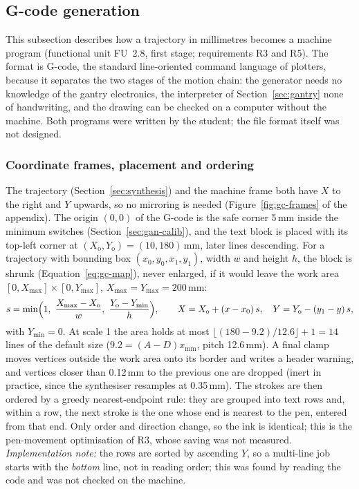 \subsection{G-code generation}
\label{sec:gcode}

This subsection describes how a trajectory in millimetres becomes a machine program (functional unit FU~2.8, first stage; requirements R3 and R5).
The format is G-code, the standard line-oriented command language of plotters, because it separates the two stages of the motion chain: the generator needs no knowledge of the gantry electronics, the interpreter of Section~\ref{sec:gantry} none of handwriting, and the drawing can be checked on a computer without the machine.
Both programs were written by the student; the file format itself was not designed.

\subsubsection{Coordinate frames, placement and ordering}

The trajectory (Section~\ref{sec:synthesis}) and the machine frame both have $X$ to the right and $Y$ upwards, so no mirroring is needed (Figure~\ref{fig:gc-frames} of the appendix).
The origin $(0,0)$ of the G-code is the safe corner 5\,mm inside the minimum switches (Section~\ref{sec:gan-calib}), and the text block is placed with its top-left corner at $(X_{\mathrm o},Y_{\mathrm o})=(10,180)$\,mm, later lines descending.
For a trajectory with bounding box $(x_0,y_0,x_1,y_1)$, width $w$ and height $h$, the block is shrunk (Equation~\ref{eq:gc-map}), never enlarged, if it would leave the work area $[0,X_{\max}]\times[0,Y_{\max}]$, $X_{\max}=Y_{\max}=200$\,mm:
\begin{equation}
s=\min\Bigl(1,\ \frac{X_{\max}-X_{\mathrm o}}{w},\ \frac{Y_{\mathrm o}-Y_{\min}}{h}\Bigr),\qquad X=X_{\mathrm o}+(x-x_0)\,s,\quad Y=Y_{\mathrm o}-(y_1-y)\,s,
\label{eq:gc-map}
\end{equation}
with $Y_{\min}=0$.
At scale 1 the area holds at most $\lfloor(180-9.2)/12.6\rfloor+1=14$ lines of the default size ($9.2=(A-D)x_{\mathrm{mm}}$, pitch 12.6\,mm).
A final clamp moves vertices outside the work area onto its border and writes a header warning, and vertices closer than 0.12\,mm to the previous one are dropped (inert in practice, since the synthesiser resamples at 0.35\,mm).
The strokes are then ordered by a greedy nearest-endpoint rule: they are grouped into text rows and, within a row, the next stroke is the one whose end is nearest to the pen, entered from that end.
Only order and direction change, so the ink is identical; this is the pen-movement optimisation of R3, whose saving was not measured.
\emph{Implementation note:} the rows are sorted by ascending $Y$, so a multi-line job starts with the \emph{bottom} line, not in reading order; this was found by reading the code and was not checked on the machine.

